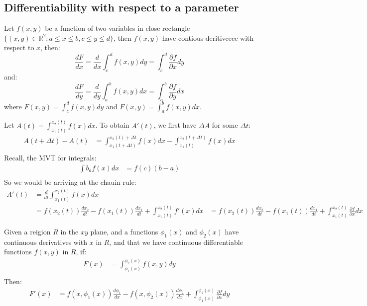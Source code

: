 \documentclass[11pt]{report}
\begin{document}
\subsection{Differentiability with respect to a parameter}
\begin{theorem}
    Let $f(x, y)$ be a function of two variables in close rectangle $\{(x,y) \in \mathbb{R}^2: a \leq x \leq b, c \leq y \leq d\}$, then $f(x, y)$ have contious deritivcece with respect to $x$, then:
    $$ \frac{dF}{dx} = \frac{d}{dx}\int^d_c f(x, y) dy = \int^d_c \frac{\partial f}{\partial x} dy$$
    and:
    $$ \frac{dF}{dy} = \frac{d}{dy}\int^b_a f(x, y) dx = \int^b_a \frac{\partial f}{\partial y} dx$$
    where $F(x,y) = \int^d_c f(x, y) dy$ and $F(x,y) = \int^b_a f(x, y) dx$.
\end{theorem}
\begin{example}
    Let $A(t) = \int_{x_1(t)}^{x_2(t)} f(x) dx$. To obtain $A'(t)$, we first have $\Delta A$ for some $\Delta t$:
    \begin{align*}
        A(t + \Delta t) - A(t) &= \int_{x_1(t + \Delta t)}^{x_2(t) + \Delta t} f(x) dx - \int_{x_1(t)}^{x_2(t+ \Delta t)} f(x) dx \\
    \end{align*}
    Recall, the MVT for integrals:
    \begin{align*}
        \int b_ a f(x) dx &= f(c)(b-a) \\
    \end{align*}
    So we would be arriving at the chauin rule:
    \begin{align*}
        A'(t) &= \frac{d}{dt} \int_{x_1(t)}^{x_2(t)} f(x) dx \\
        &= f(x_2(t))\frac{dx_2}{dt} - f(x_1(t))\frac{dx_1}{dt} + \int_{x_1(t)}^{x_2(t)} f'(x) dx
        &= f(x_2(t))\frac{dx_2}{dt} - f(x_1(t))\frac{dx_1}{dt} + \int_{x_1(t)}^{x_2(t)} \frac{\partial f}{\partial x} dx
    \end{align*}
\end{example}
\begin{theorem}
    Given a reigion $R$ in the $xy$ plane, and a functions $\phi_1(x)$ and $\phi_2(x)$ have continuous derivatives with $x$ in $R$, and that we have continuous differentiable functions $f(x, y)$ in $R$, if:
    \begin{align*}
       F(x) &= \int_{\phi_1(x)}^{\phi_2(x)} f(x, y) dy \\
    \end{align*}
    Then:
    \begin{align*}
        F'(x) &= f(x, \phi_1(x))\frac{d\phi_1}{dx} - f(x, \phi_2(x))\frac{d\phi_2}{dx} + \int_{\phi_1(x)}^{\phi_2(x)} \frac{\partial f}{\partial x} dy
    \end{align*}
\end{theorem}
\end{document}
